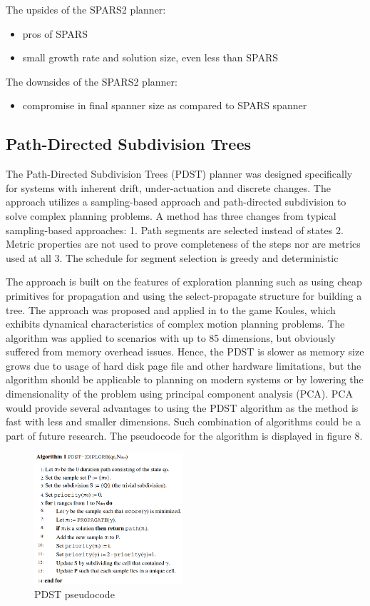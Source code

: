 \documentclass[conference]{IEEEtran} \usepackage[T1]{fontenc} \usepackage[backend=biber, style=ieee]{biblatex}
\begin{document}
The upsides of the SPARS2 planner:
\begin{itemize}
 \item pros of SPARS
 \item small growth rate and solution size, even less than SPARS
\end{itemize}

The downsides of the SPARS2 planner:
\begin{itemize}
 \item compromise in final spanner size as compared to SPARS spanner
\end{itemize}

\subsection{Path-Directed Subdivision Trees} \label{PDST}
The Path-Directed Subdivision Trees (PDST) planner was designed specifically for systems with inherent drift, under-actuation and discrete changes. The approach utilizes a 
sampling-based approach and path-directed subdivision to solve complex planning problems. A method has three changes from typical sampling-based approaches:
1. Path segments are selected instead of states
2. Metric properties are not used to prove completeness of the steps nor are metrics used at all
3. The schedule for segment selection is greedy and deterministic

The approach is built on the features of exploration planning such as using cheap primitives for propagation and using the select-propagate structure for building a tree.
The approach was proposed and applied in \cite{pdst} to the game Koules, which exhibits dynamical characteristics of complex motion planning problems. The algorithm was applied 
to scenarios with up to 85 dimensions, but obviously suffered from memory overhead issues. Hence, the PDST is slower as memory size grows due to usage of hard disk page file and 
other hardware limitations, but the algorithm should be applicable to planning on modern systems or by lowering the dimensionality of the problem using principal component analysis 
(PCA). PCA would provide several advantages to using the PDST algorithm as the method is fast with less and smaller dimensions. Such combination of algorithms could be a part of 
future research. The pseudocode for the algorithm is displayed in figure 8.

\begin{figure}
\label{figure8} 
\centering 
\includegraphics[width=0.49\textwidth]{pdst}
\caption{PDST pseudocode}
\end{figure}
\end{document}
